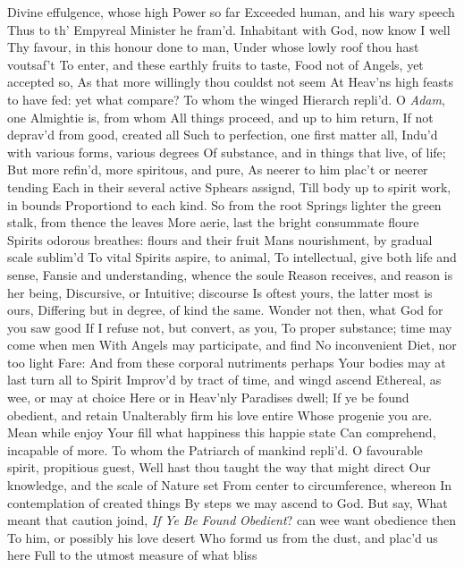 \documentclass[11pt]{book}
\newcounter {first}
\newcounter {last}
\begin{document}
Divine effulgence, whose high Power so far 
Exceeded human, and his wary speech 
Thus to th' Empyreal Minister he fram'd. 
\quad Inhabitant with God, now know I well 
Thy favour, in this honour done to man, 
Under whose lowly roof thou hast voutsaf't 
To enter, and these earthly fruits to taste, 
Food not of Angels, yet accepted so, 
As that more willingly thou couldst not seem 
At Heav'ns high feasts to have fed: yet what compare? 
\quad  To whom the winged Hierarch repli'd. 
O \textit{Adam}, one Almightie is, from whom 
All things proceed, and up to him return, 
If not deprav'd from good, created all 
Such to perfection, one first matter all, 
Indu'd with various forms, various degrees 
Of substance, and in things that live, of life; 
But more refin'd, more spiritous, and pure, 
As neerer to him plac't or neerer tending 
Each in their several active Sphears assignd, 
Till body up to spirit work, in bounds 
Proportiond to each kind.  So from the root 
Springs lighter the green stalk, from thence the leaves 
More aerie, last the bright consummate floure 
Spirits odorous breathes: flours and their fruit 
Mans nourishment, by gradual scale sublim'd 
To vital Spirits aspire, to animal, 
To intellectual, give both life and sense, 
Fansie and understanding, whence the soule 
Reason receives, and reason is her being, 
Discursive, or Intuitive; discourse 
Is oftest yours, the latter most is ours, 
Differing but in degree, of kind the same. 
Wonder not then, what God for you saw good 
If I refuse not, but convert, as you, 
To proper substance; time may come when men 
With Angels may participate, and find 
No inconvenient Diet, nor too light Fare: 
And from these corporal nutriments perhaps 
Your bodies may at last turn all to Spirit 
Improv'd by tract of time, and wingd ascend 
Ethereal, as wee, or may at choice 
Here or in Heav'nly Paradises dwell; 
If ye be found obedient, and retain 
Unalterably firm his love entire 
Whose progenie you are.  Mean while enjoy 
Your fill what happiness this happie state 
Can comprehend, incapable of more. 
\quad To whom the Patriarch of mankind repli'd. 
O favourable spirit, propitious guest, 
Well hast thou taught the way that might direct 
Our knowledge, and the scale of Nature set 
From center to circumference, whereon 
In contemplation of created things 
By steps we may ascend to God.  But say, 
What meant that caution joind, \textit{If} \textit{Ye} \textit{Be} \textit{Found} 
\textit{Obedient}? can wee want obedience then 
To him, or possibly his love desert 
Who formd us from the dust, and plac'd us here 
Full to the utmost measure of what bliss 
\end{document}
